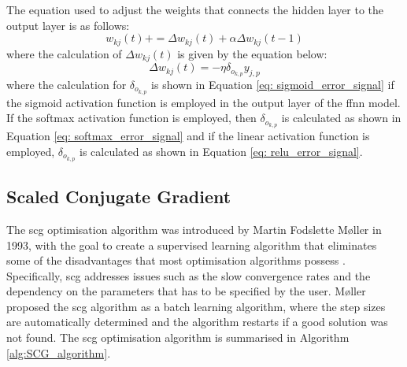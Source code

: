\documentclass[10pt, conference]{IEEEtran}
\begin{document}
The equation used to adjust the weights that connects the hidden layer to the output layer is as follows:
\begin{equation}
    w_{kj}(t) += \Delta w_{kj}(t) + \alpha \Delta w_{kj}(t-1) \label{eq: w_weights_update}
\end{equation}
where the calculation of $\Delta w_{kj}(t)$ is given by the equation below:
\begin{equation}
    \Delta w_{kj}(t) = -\eta \delta_{o_{k,p}} y_{j,p} \label{eq: delta_w}
\end{equation}
where the calculation for $\delta_{o_{k,p}}$ is shown in Equation \ref{eq: sigmoid_error_signal} if the sigmoid
activation function is employed in the output layer of the \acrshort{ffnn} model. If the softmax activation
function is employed, then $\delta_{o_{k,p}}$ is calculated as shown in Equation \ref{eq: softmax_error_signal}
and if the linear activation function is employed, $\delta_{o_{k,p}}$ is calculated as shown in Equation
\ref{eq: relu_error_signal}.

\subsection{Scaled Conjugate Gradient} \label{section: SCG_background}

The \acrshort{scg} optimisation algorithm was introduced by Martin Fodslette Møller in 1993, with the goal to create
a supervised learning algorithm that eliminates some of the disadvantages that most optimisation algorithms possess
\cite{scg_ref}. Specifically, \acrshort{scg} addresses issues such as the slow convergence rates and the dependency
on the parameters that has to be specified by the user. Møller proposed the \acrshort{scg} algorithm as a batch
learning algorithm, where the step sizes are automatically determined and the algorithm restarts if a good solution
was not found. The \acrshort{scg} optimisation algorithm is summarised in Algorithm \ref{alg:SCG_algorithm}.
\end{document}
